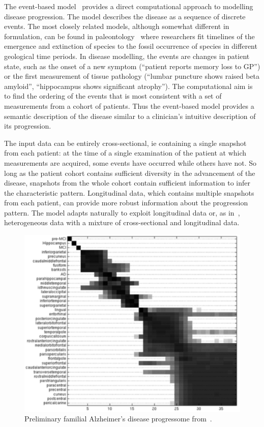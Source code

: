 \documentclass[a4paper,11pt]{article}
\begin{document}
The event-based model~\cite{FonteijnScience11} provides a direct
computational approach to modelling disease progression. The model
describes the disease as a sequence of discrete events. The most
closely related models, although somewhat different in formulation,
can be found in paleontology~\cite{PuolamakiPLoSCompBiol06} where
researchers fit timelines of the emergence and extinction of species
to the fossil occurrence of species in different geological time
periods. In disease modelling, the events are changes in patient
state, such as the onset of a new symptom (``patient reports memory
loss to GP'') or the first measurement of tissue pathology (``lumbar
puncture shows raised beta amyloid'', ``hippocampus shows significant
atrophy''). The computational aim is to find the ordering of the
events that is most consistent with a set of measurements from a
cohort of patients. Thus the event-based model provides a semantic
description of the disease similar to a clinician's intuitive
description of its progression.

The input data can be entirely cross-sectional, ie containing a single
snapshot from each patient: at the time of a single examination of
the patient at which measurements are acquired, some events have
occurred while others have not.  So long as the patient cohort
contains sufficient diversity in the advancement of the disease,
snapshots from the whole cohort contain sufficient information to
infer the characteristic pattern.  Longitudinal data, which contains
multiple snapshots from each patient, can provide more robust
information about the progression pattern.  The model adapts naturally
to exploit longitudinal data or, as in~\cite{FonteijnScience11},
heterogeneous data with a mixture of cross-sectional and longitudinal
data.

\begin{figure}
\centering
\includegraphics[clip, width=120mm]{fAD_Progressome}
\caption{Preliminary familial Alzheimer's disease progressome from~\cite{FonteijnScience11}.}
\label{fig:progressome}
\end{figure}
\end{document}
